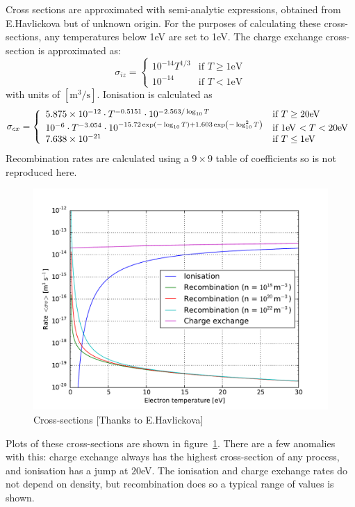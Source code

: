 \documentclass[12pt,a4paper]{article}
\begin{document}
Cross sections are approximated with semi-analytic expressions, obtained from E.Havlickova but of unknown origin. 
For the purposes of calculating these cross-sections, any temperatures below 1eV are set to 1eV. 
The charge exchange cross-section is approximated as:
\begin{equation}
  \sigma_{iz} = \left\{\begin{array}{ll}
10^{-14} T^{1/3} & \textrm{if $T \ge 1$eV} \\
10^{-14} & \textrm{if $T < 1$eV} \end{array}\right.
\end{equation}
with units of $[\textrm{m}^3/\textrm{s}]$. Ionisation is calculated as
\begin{equation}
\sigma_{cx} = \left\{\begin{array}{ll}
5.875\times 10^{-12}\cdot T^{-0.5151} \cdot 10^{-2.563/\log_{10}T} & \textrm{if $T \ge 20$eV} \\
10^{-6}\cdot T^{-3.054}\cdot 10^{-15.72\exp\left(-\log_{10}T\right) + 1.603\exp\left(-\log^2_{10}T\right)} & \textrm{if $1$eV $ < T < 20$eV} \\
7.638\times 10^{-21} & \textrm{if $T \le 1$eV}\end{array}\right.
\end{equation}
Recombination rates are calculated using a $9\times 9$ table of coefficients
so is not reproduced here.

\begin{figure}[h]
\centering
\includegraphics[width=0.7\columnwidth]{hydrogen.pdf}
\caption{Cross-sections [Thanks to E.Havlickova]}
\label{fig:sigma}
\end{figure}
Plots of these cross-sections are shown in figure~\ref{fig:sigma}. There are a few anomalies with this: charge exchange always has the highest cross-section of any process, and ionisation has a jump at $20$eV. The ionisation and
charge exchange rates do not depend on density, but recombination does so a typical range of values is shown.
\end{document}
